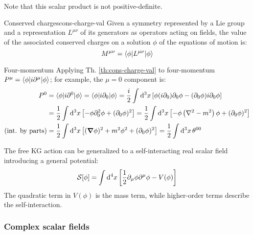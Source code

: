 Note that this scalar product is not positive-definite.

\begin{theorem}{Conserved charges}{cons-charge-val}
  Given a symmetry represented by a Lie group and a representation $ L^{\mu \nu} $ of its generators as operators acting on fields, the value of the associated conserved charges on a solution $ \phi $ of the equations of motion is:
  \begin{equation}
    M^{\mu \nu} = \braket{\phi | L^{\mu \nu} | \phi}
    \label{eq:1.75}
  \end{equation}
\end{theorem}

\begin{example}{Four-momentum}{}
  Applying Th. \ref{th:cons-charge-val} to four-momentum $ P^\mu = \braket{\phi | i \partial^\mu | \phi} $; for example, the $ \mu = 0 $ component is:
  \begin{equation*}
    \begin{split}
      P^0 &= \braket{\phi | i \partial^0 | \phi} = \braket{\phi | i \partial_0 | \phi} = \frac{i}{2} \int \mathrm{d}^3 x \left[ \phi (i \partial_0) \partial_0 \phi - (\partial_0 \phi) i \partial_0 \phi \right] \\
          &= \frac{1}{2} \int \mathrm{d}^3 x \left[ - \phi \partial_0^2 \phi + (\partial_0 \phi)^2 \right] = \frac{1}{2} \int \mathrm{d}^3 x \left[ - \phi \left( \nabla^2 - m^2 \right) \phi + (\partial_0 \phi)^2 \right] \\
      (\text{int. by parts}) &= \frac{1}{2} \int \mathrm{d}^3 x \left[ (\boldsymbol{\nabla} \phi)^2 + m^2 \phi^2 + (\partial_0 \phi)^2 \right] = \frac{1}{2} \int \mathrm{d}^3 x\, \theta^{00}
    \end{split}
  \end{equation*}
\end{example}

The free KG action can be generalized to a self-interacting real scalar field introducing a general potential:
\begin{equation}
  \mathcal{S}[\phi] = \int \mathrm{d}^4 x \left[ \frac{1}{2} \partial_\mu \phi \partial^\mu \phi - V(\phi) \right]
  \label{eq:1.76}
\end{equation}
The quadratic term in $ V(\phi) $ is the mass term, while higher-order terms describe the self-interaction.

\subsubsection{Complex scalar fields}

